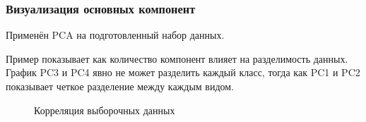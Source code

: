 \documentclass[../body.tex]{subfiles}
\begin{document}
\subsubsection{Визуализация основных компонент}
Применён PCA на подготовленный набор данных. 

Пример показывает как количество компонент влияет на разделимость данных. График  PC3 и PC4 явно не может разделить каждый класс, тогда как PC1 и PC2 показывает четкое разделение между каждым видом.

\begin{figure}[H]
	\caption{\label{corr}Корреляция выборочных данных}
\end{figure}
\end{document}
